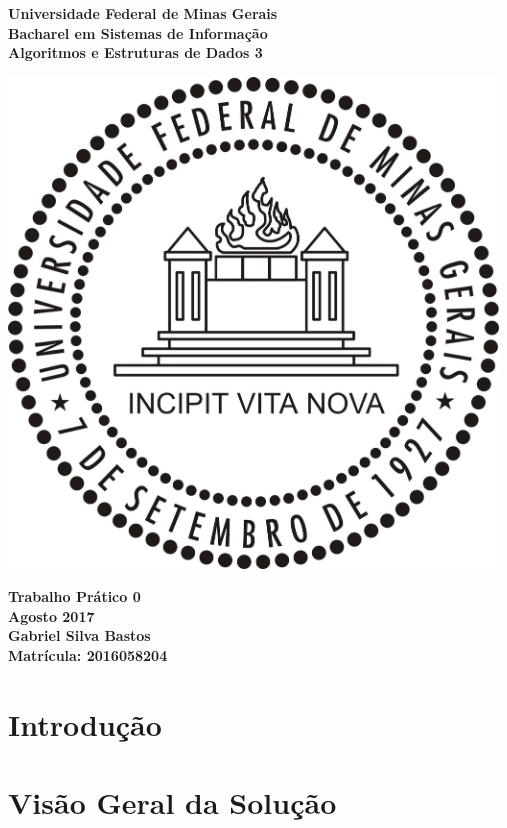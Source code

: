 \documentclass{article}
\begin{document}
\begin{titlepage}
  \centering
  
  \vfill{
    \bfseries\Huge
    Universidade Federal de Minas Gerais\\[5pt]
    \bfseries\Large
    Bacharel em Sistemas de Informação \\
    Algoritmos e Estruturas de Dados 3\\
  }
  
  \vfill
  
  \includegraphics[width=13cm]{images/ufmg_logo.jpg}
  
  \vfill{
    \bfseries\Large
    Trabalho Prático 0\\
    Agosto 2017\\
  }
  \vfill{
    \bfseries\large
    Gabriel Silva Bastos\\[5pt]
    Matrícula: 2016058204
  }
\end{titlepage}


\section{Introdução}


\section{Visão Geral da Solução}
\end{document}
